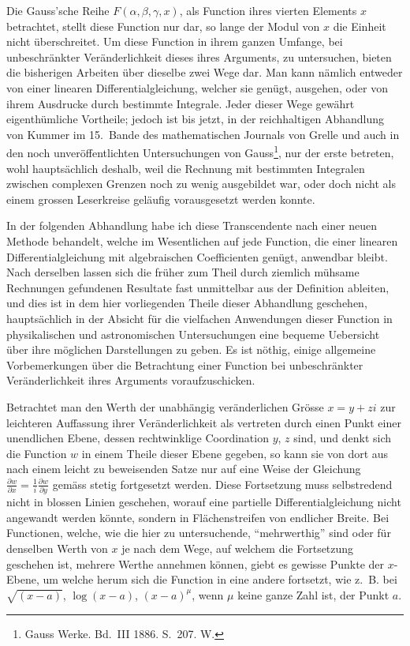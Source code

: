 \documentclass[12pt,a4paper]{article}
\begin{document}
Die Gauss'sche Reihe $F(\alpha, \beta, \gamma, x)$, als Function ihres vierten Elements $x$ betrachtet, stellt diese Function nur dar, so lange der Modul von $x$ die Einheit nicht überschreitet. Um diese Function in ihrem ganzen Umfange, bei unbeschränkter Veränderlichkeit dieses ihres Arguments, zu untersuchen, bieten die bisherigen Arbeiten über dieselbe zwei Wege dar. Man kann nämlich entweder von einer linearen Differentialgleichung, welcher sie genügt, ausgehen, oder von ihrem Ausdrucke durch bestimmte Integrale. Jeder dieser Wege gewährt eigenthümliche Vortheile; jedoch ist bis jetzt, in der reichhaltigen Abhandlung von Kummer im 15.\ Bande des mathematischen Journals von Grelle und auch in den noch unveröffentlichten Untersuchungen von Gauss\footnote{Gauss Werke. Bd.~III 1886. S.~207. W.}, nur der erste betreten, wohl hauptsächlich deshalb, weil die Rechnung mit bestimmten Integralen zwischen complexen Grenzen noch zu wenig ausgebildet war, oder doch nicht als einem grossen Leserkreise geläufig vorausgesetzt werden konnte.

In der folgenden Abhandlung habe ich diese Transcendente nach einer neuen Methode behandelt, welche im Wesentlichen auf jede Function, die einer linearen Differentialgleichung mit algebraischen Coefficienten genügt, anwendbar bleibt. Nach derselben lassen sich die früher zum Theil durch ziemlich mühsame Rechnungen gefundenen Resultate fast unmittelbar aus der Definition ableiten, und dies ist in dem hier vorliegenden Theile dieser Abhandlung geschehen, hauptsächlich in der Absicht für die vielfachen Anwendungen dieser Function in physikalischen und astronomischen Untersuchungen eine bequeme Uebersicht über ihre möglichen Darstellungen zu geben. Es ist nöthig, einige allgemeine Vorbemerkungen über die Betrachtung einer Function bei unbeschränkter Veränderlichkeit ihres Arguments voraufzuschicken.

Betrachtet man den Werth der unabhängig veränderlichen Grösse $x = y + zi$ zur leichteren Auffassung ihrer Veränderlichkeit als vertreten durch einen Punkt einer unendlichen Ebene, dessen rechtwinklige Coordination $y$, $z$ sind, und denkt sich die Function $w$ in einem Theile dieser Ebene gegeben, so kann sie von dort aus nach einem leicht zu beweisenden Satze nur auf eine Weise der Gleichung $\frac{\partial w}{\partial x} = \frac{1}{i}\frac{\partial w}{\partial y}$ gemäss stetig fortgesetzt werden. Diese Fortsetzung muss selbstredend nicht in blossen Linien geschehen, worauf eine partielle Differentialgleichung nicht angewandt werden könnte, sondern in Flächenstreifen von endlicher Breite. Bei Functionen, welche, wie die hier zu untersuchende, ``mehrwerthig'' sind oder für denselben Werth von $x$ je nach dem Wege, auf welchem die Fortsetzung geschehen ist, mehrere Werthe annehmen können, giebt es gewisse Punkte der $x$-Ebene, um welche herum sich die Function in eine andere fortsetzt, wie z.~B. bei $\sqrt{(x-a)}$, $\log(x-a)$, $(x-a)^\mu$, wenn $\mu$ keine ganze Zahl ist, der Punkt $a$.
\end{document}
